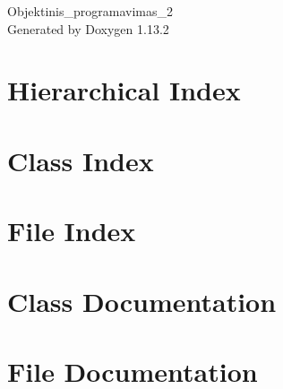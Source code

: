 \documentclass[twoside]{book}
\newcommand{\+}{\discretionary{\mbox{\scriptsize$\hookleftarrow$}}{}{}}
\newcommand{\clearemptydoublepage}{%
    \newpage{\pagestyle{empty}\cleardoublepage}%
  }
\begin{document}
  \raggedbottom
    \hypersetup{pageanchor=false,
                bookmarksnumbered=true,
                pdfencoding=unicode
               }
  \begin{titlepage}
  \vspace*{7cm}
  \begin{center}%
  {\Large Objektinis\+\_\+programavimas\+\_\+2}\\
  \vspace*{1cm}
  {\large Generated by Doxygen 1.13.2}\\
  \end{center}
  \end{titlepage}
  \clearemptydoublepage
  \tableofcontents
  \clearemptydoublepage
  \hypersetup{pageanchor=true}

\chapter{Hierarchical Index}

\chapter{Class Index}

\chapter{File Index}

\chapter{Class Documentation}



\chapter{File Documentation}




  \backmatter
  \newpage
  \clearemptydoublepage
  \printindex
\end{document}
